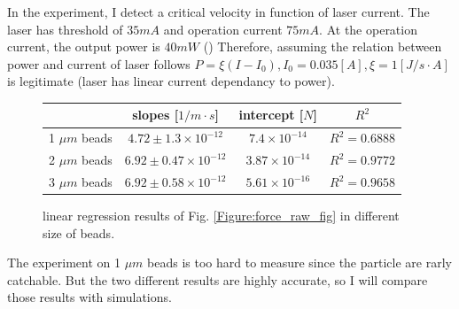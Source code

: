 \documentclass{article}
\begin{document}
In the experiment, I detect a critical velocity in function of laser current.
The laser has threshold of $35mA$ and operation current $75mA$.
At the operation current, the output power is $40 mW$ (\cite{Laser_spec})
Therefore, assuming the relation between power and current of laser follows $P= \xi  (I-I_0), I_0 = 0.035 [A], \xi = 1 [J/s\cdot A]$ is legitimate (laser has linear current dependancy to power).
\begin{figure}[H]
    \centering
    \begin{tabular}{|c| c| c|c|}
            & slopes [$1/m\cdot s$]& intercept [$N$]& $R^2$\\
        \hline
        1 $\mu m$ beads & $4.72\pm 1.3 \times 10^{-12}$ & $7.4 \times 10^{-14}$ &$R^2=0.6888$\\
        2 $\mu m$ beads & $6.92\pm 0.47 \times 10^{-12}$ & $3.87 \times 10^{-14}$&$R^2=0.9772$\\
        3 $\mu m$ beads & $6.92\pm 0.58 \times 10^{-12}$ & $5.61 \times 10^{-16}$&$R^2=0.9658$
        
    \end{tabular}
    \caption{linear regression results of Fig. \ref{Figure:force_raw_fig} in different size of beads.}
    \label{Figure:force power linear regression results}
\end{figure}

The experiment on 1 $\mu m$ beads is too hard to measure since the particle are rarly catchable.
But the two different results are highly accurate, so I will compare those results with simulations.
\end{document}
